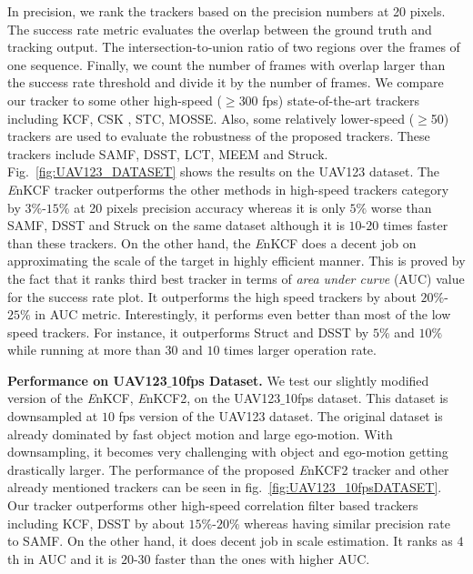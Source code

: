 \documentclass{bmvc2k}
\begin{document}
In precision, we rank the trackers based on the precision numbers at
20 pixels. The success rate metric evaluates the overlap between the
ground truth and tracking output. The intersection-to-union ratio of
two regions over the frames of one sequence. Finally, we count the
number of frames with overlap larger than the success rate threshold
and divide it by the number of frames. We compare our tracker to some
other high-speed ($\geq$300 fps) state-of-the-art trackers including
KCF\cite{henriques2015high}, CSK \cite{henriques2012exploiting},
STC\cite{zhang2014fast},
MOSSE\cite{bolme2010visual,henriques2015high}. Also, some relatively
lower-speed ($\geq$50) trackers are used to evaluate the robustness of
the proposed trackers. These trackers include SAMF\cite{li2014scale},
DSST\cite{danelljan2014accurate}, LCT\cite{ma2015long},
MEEM\cite{zhang2014meem} and Struck\cite{hare2012efficient}.
Fig.~\ref{fig:UAV123_DATASET} shows the results on the UAV123
dataset. The {\it E}nKCF tracker outperforms the other methods in
high-speed trackers category by $3\%$-$15\%$ at 20 pixels precision
accuracy whereas it is only $5\%$ worse than SAMF, DSST and Struck on
the same dataset although it is $10$-$20$ times faster than these
trackers. On the other hand, the {\it E}nKCF does a decent job on
approximating the scale of the target in highly efficient manner. This
is proved by the fact that it ranks third best tracker in terms of
\textit{area under curve} (AUC) value for the success rate plot. It
outperforms the high speed trackers by about $20\%$-$25\%$ in AUC
metric. Interestingly, it performs even better than most of the low
speed trackers. For instance, it outperforms Struct and DSST by $5\%$
and $10\%$ while running at more than $30$ and $10$ times larger
operation rate.

\textbf{Performance on UAV123$\_$10fps Dataset.} We test our
slightly modified version of the {\it E}nKCF, {\it E}nKCF2, on the
UAV123$\_$10fps dataset. This dataset is downsampled at $10$ fps
version of the UAV123 dataset. The original dataset is already
dominated by fast object motion and large ego-motion. With
downsampling, it becomes very challenging with object and ego-motion
getting drastically larger. The performance of the proposed {\it
  E}nKCF2 tracker and other already mentioned trackers can be seen in
fig.~\ref{fig:UAV123_10fpsDATASET}. Our tracker outperforms other
high-speed correlation filter based trackers including KCF, DSST by
about $15\%$-$20\%$ whereas having similar precision rate to SAMF. On
the other hand, it does decent job in scale estimation. It ranks as
$4$th in AUC and it is $20$-$30$ faster than the ones with
higher AUC.
\end{document}
